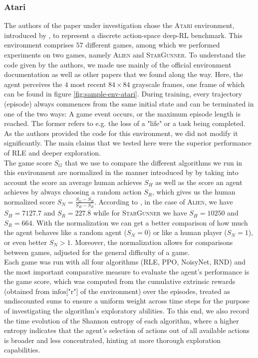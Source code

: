 \documentclass[10pt]{article} %
\begin{document}
\subsubsection{Atari}

\noindent The authors of the paper under investigation chose the \textsc{Atari} environment, introduced by \cite{atari-introduction}, to represent a discrete action-space deep-RL benchmark. This environment comprises $57$ different games, among which we performed experiments on two games, namely \textsc{Alien} and \textsc{StarGunner}. To understand the code given by the authors, we made use mainly of the official environment documentation as well as other papers that we found along the way. Here, the agent perceives the $4$ most recent $84\times84$ grayscale frames, one frame of which can be found in figure \ref{fig:sample-env-atari}. During training, every trajectory (episode) always commences from the same initial state and can be terminated in one of the two ways: A game event occurs, or the maximum episode length is reached. The former refers to e.g. the loss of a "life" or a task being completed. As the authors provided the code for this environment, we did not modify it significantly. The main claims that we tested here were the superior performance of RLE and deeper exploration.\\

\noindent The game score $S_{G}$ that we use to compare the different algorithms we run in this environment are normalized in the manner introduced by \cite{agent57} by taking into account the score an average human achieves $S_{H}$ as well as the score an agent achieves by always choosing a random action $S_{R}$, which gives us the human normalized score $S_{N} = \frac{S_{G} - S_{R}}{S_{H} - S_{R}}$. According to \cite{agent57}, in the case of \textsc{Alien}, we have $S_{H} = 7127.7$ and $S_{R} = 227.8$ while for \textsc{StarGunner} we have $S_{H} = 10250$ and $S_{R} = 664$. With the normalization we can get a better comparison of how much the agent behaves like a random agent ($S_{N} = 0$) or like a human player ($S_{N} = 1$), or even better $S_{N} > 1$. Moreover, the normalization allows for comparisons between games, adjusted for the general difficulty of a game.\\

\noindent Each game was run with all four algorithms (RLE, PPO, NoisyNet, RND) and the most important comparative measure to evaluate the agent's performance is the game score, which was computed from the cumulative extrinsic rewards (obtained from $\text{infos["r"]}$ of the environment) over the episodes, treated as undiscounted sums to ensure a uniform weight across time steps for the purpose of investigating the algorithm's exploratory abilities. To this end, we also record the time evolution of the Shannon entropy of each algorithm, where a higher entropy indicates that the agent's selection of actions out of all available actions is broader and less concentrated, hinting at more thorough exploration capabilities.\\
\end{document}
